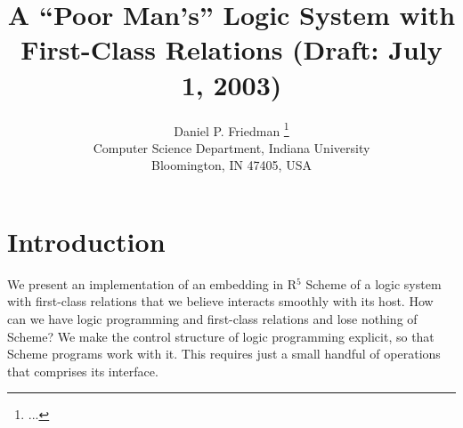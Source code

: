 \RequirePackage{alltt}


\newcommand{\comment}[1]{}

\def\myrule{\raisebox{3.4ex}[1.5ex][.75ex]{\rule{126mm}{.01mm}}{\vspace{-3ex}}\\}
\def\codefontsize{\fontsize{9}{10}\selectfont\tt} 
\def\inlinecode#1{\hbox{\codefontsize #1\/}}
\long\def\inlinecodebreak#1{{\codefontsize #1\/}}
\newenvironment{verbatimcode}%
  {\endgraf\codefontsize\verbatim}%
  {\endverbatim}
\newenvironment{ttcode}
  {\codefontsize\begin{alltt}}
  {\end{alltt}}
\def\Di{$D_i$}
\def\Ds{$D_s$}
\newcommand{\Rule}[4]{
\makebox{{\rm #1}
$\displaystyle
\frac{\begin{array}{l}#2\\\end{array}}
{\begin{array}{l}#3\\\end{array}}$
 #4}}





\title{A ``Poor Man's'' Logic System with First-Class Relations
(Draft: July 1, 2003)} \author[Friedman]{Daniel
P. Friedman \thanks{...}
\\ Computer Science Department, Indiana University 
\\ Bloomington, IN 47405, USA
}
\maketitle[t]

\section{Introduction}
We present an implementation of an embedding in R$^5$
Scheme of a logic system with first-class relations
that we believe interacts smoothly with its host.  How can we have
logic programming and first-class relations and lose nothing of
Scheme?  We make the control structure of logic programming explicit,
so that Scheme programs work with it.  This requires just a small
handful of operations that comprises its interface.

